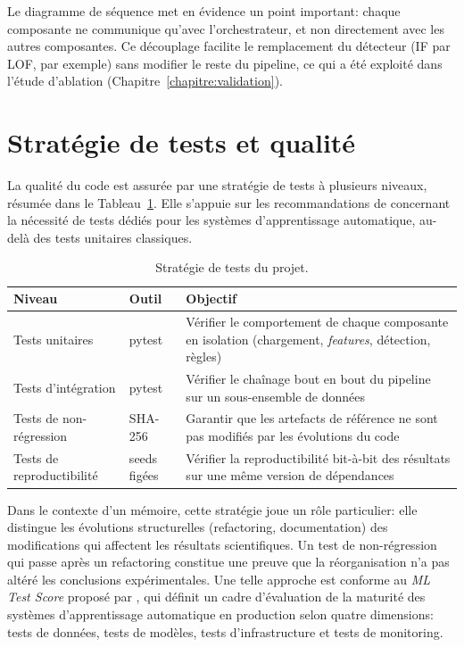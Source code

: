 Le diagramme de séquence met en évidence un point important: chaque composante ne communique qu'avec
l'orchestrateur, et non directement avec les autres composantes. Ce découplage facilite le
remplacement du détecteur (IF par LOF, par exemple) sans modifier le reste du pipeline, ce
qui a été exploité dans l'étude d'ablation (Chapitre~\ref{chapitre:validation}).

\section{Stratégie de tests et qualité}

La qualité du code est assurée par une stratégie de tests à plusieurs niveaux, résumée
dans le Tableau~\ref{tab:tests_strategie}. Elle s'appuie sur les recommandations
de \cite{sculley2015hidden} concernant la nécessité de tests dédiés pour les systèmes d'apprentissage automatique,
au-delà des tests unitaires classiques.

\begin{table}[H]
    \centering
    \caption{Stratégie de tests du projet.}
    \label{tab:tests_strategie}
    \begin{tabular}{llp{6cm}}
        \toprule
        \textbf{Niveau} & \textbf{Outil} & \textbf{Objectif} \\
        \midrule
        Tests unitaires & pytest & Vérifier le comportement de chaque composante
            en isolation (chargement, \textit{features}, détection, règles) \\
        Tests d'intégration & pytest & Vérifier le chaînage bout en bout du pipeline
            sur un sous-ensemble de données \\
        Tests de non-régression & SHA-256 & Garantir que les artefacts de référence ne
            sont pas modifiés par les évolutions du code \\
        Tests de reproductibilité & seeds figées & Vérifier la reproductibilité bit-à-bit
            des résultats sur une même version de dépendances \\
        \bottomrule
    \end{tabular}
\end{table}

Dans le contexte d'un mémoire, cette stratégie joue un rôle particulier: elle distingue
les évolutions structurelles (refactoring, documentation) des modifications qui
affectent les résultats scientifiques. Un test de non-régression qui passe après un
refactoring constitue une preuve que la réorganisation n'a pas altéré les conclusions
expérimentales.
Une telle approche est conforme au \textit{ML Test Score} proposé par \cite{breck2017ml}, qui
définit un cadre d'évaluation de la maturité des systèmes d'apprentissage automatique en production selon quatre
dimensions: tests de données, tests de modèles, tests d'infrastructure et tests de
monitoring.

